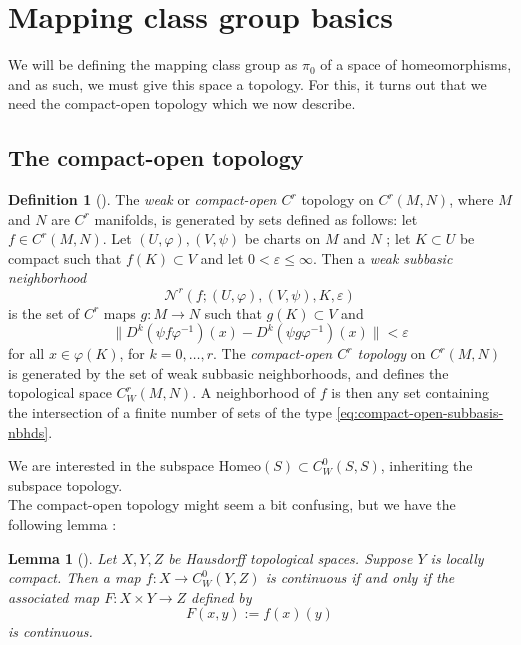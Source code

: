 \documentclass[reqno]{amsart}
\newtheorem{lemma}[theorem]{Lemma}
\theoremstyle{definition}
\newtheorem{definition}[theorem]{Definition}
\theoremstyle{remark}
\newcommand{\Homeo}{{\mathrm{Homeo}}}
\begin{document}
\section{Mapping class group basics}

We will be defining the mapping class group as $\pi_0$
of a space of homeomorphisms, and as such, we must
give this space a topology. For this, it turns out that we need
the compact-open topology which we now describe.

\subsection{The compact-open topology}

\begin{definition}[]
    The \textit{weak} or \textit{compact-open $C^{r}$ }
    topology on $C^{r} \left( M,N \right) $, where
    $M$ and $N$ are $C^{r}$ manifolds, is generated
    by sets defined as follows:
    let $f \in C^{r}(M,N)$. Let $\left( U, \varphi \right),
    \left( V, \psi  \right) $ be charts on
    $M$ and $N$ ; let $K \subset U$ be compact such that
    $f(K) \subset V$ and let $0 < \varepsilon \le 
    \infty $. Then a \textit{weak subbasic neighborhood}
    \[
    \mathcal{N}^{r} \left( f ; \left( U, \varphi  \right) ,
    \left( V, \psi  \right) , K, \varepsilon \right) 
    \tag{$\zeta$}\label{eq:compact-open-subbasis-nbhds}
    \] 
    is the set of $C^{r}$ maps $g \colon M \to N$ such that
    $g(K) \subset V$ and
    \[
    \|D^{k}\left( \psi f \varphi^{-1} \right) (x)
    -D^{k} \left( \psi g \varphi^{-1} \right) (x)\|< \varepsilon
    \] 
    for all $x \in \varphi(K)$, for $k = 0, \ldots, r$.
    The \textit{compact-open $C^{r}$ topology} on
    $C^{r}(M,N)$ is generated by the set of weak subbasic
    neighborhoods, and defines the topological space
    $C_W^{r} (M,N)$.
    A neighborhood of $f$ is then
    any set containing the intersection
    of a finite number of sets of the
    type \eqref{eq:compact-open-subbasis-nbhds}.
\end{definition}

We are interested in the subspace
$\Homeo (S) \subset C_W^{0} (S,S)$, inheriting the
subspace topology.\\
\linebreak
The compact-open topology might seem a bit confusing, but
we have the following lemma \cite[Prop A.14]{Hatcher}:

\begin{lemma}[]\label{compact-open-isotopy}
    Let $X,Y,Z$ be Hausdorff topological spaces.
    Suppose $Y$ is locally compact. Then a 
    map $f \colon X \to C_W^{0}(Y,Z)$ is
    continuous if and only if the associated map
    $F \colon X \times Y \to Z$ defined by
    \[
    F(x,y) := f(x)(y)
    \] 
    is continuous.
\end{lemma}
\end{document}
